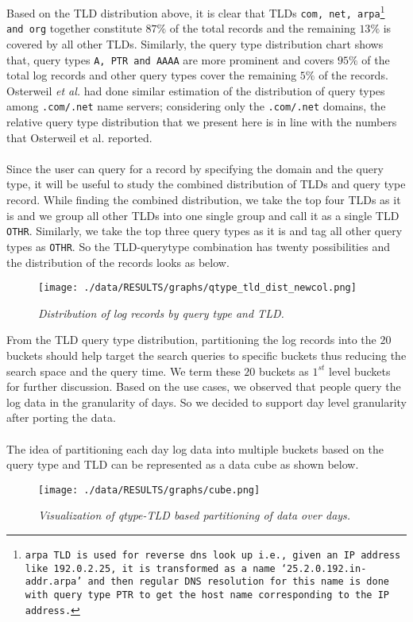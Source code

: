 \documentclass[11pt,a4paper]{article}
\begin{document}
\noindent
Based on the TLD distribution above, it is clear that TLDs \texttt{com, net, arpa\footnote{arpa TLD is used for reverse dns look up i.e., given an IP address like 192.0.2.25, it is transformed as a name `25.2.0.192.in-addr.arpa' and then regular DNS resolution for this name is done with query type PTR to get the host name corresponding to the IP address.} and org} together constitute $87\%$ of the total records and the remaining $13\%$ is covered by all other TLDs. Similarly, the query type distribution chart shows that, query types \texttt{A, PTR and AAAA} are more prominent and covers $95\%$ of the total log records and other query types cover the remaining $5\%$ of the records. Osterweil \textit{et al.}\cite{toptalker} had done similar estimation of the distribution of query types among \texttt{.com/.net} name servers; considering only the \texttt{.com/.net} domains, the relative query type distribution that we present here is in line with the numbers that Osterweil et al. reported.
\\\\
Since the user can query for a record by specifying the domain and the query type, it will be useful to study the combined distribution of TLDs and query type record. While finding the combined distribution, we take the top four TLDs as it is and we group all other TLDs into one single group and call it as a single TLD \texttt{OTHR}. Similarly, we take the top three query types as it is and tag all other query types as \texttt{OTHR}. So the TLD-querytype combination has twenty possibilities and the distribution of the records looks as below.

\begin{figure}[H] 
\centering
\texttt{[image: ./data/RESULTS/graphs/qtype\_tld\_dist\_newcol.png]}
\caption {\textit{Distribution of log records by query type and TLD.}}
\end{figure}

\noindent
From the TLD query type distribution, partitioning the log records into the $20$ buckets should help target the search queries to specific buckets thus reducing the search space and the query time. We term these $20$ buckets as $1^{st}$ level buckets for further discussion. Based on the use cases, we observed that people query the log data in the granularity of days. So we decided to support day level granularity after porting the data.
\\\\
The idea of partitioning each day log data into multiple buckets based on the query type and TLD can be represented as a data cube as shown below.
\begin{figure}[H] 
\centering
\texttt{[image: ./data/RESULTS/graphs/cube.png]}
\caption {\textit{Visualization of qtype-TLD based partitioning of data over days.}}
\label{cube}
\end{figure}
\end{document}
